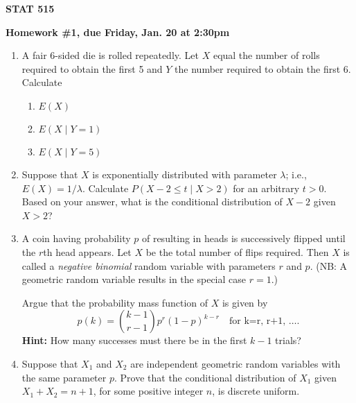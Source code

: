 \documentclass{article}
\begin{document}
\begin{center}
{\bf STAT 515}

{\bf Homework \#1, due Friday, Jan. 20 at 2:30pm}
\end{center}

\begin{enumerate}

  \item A fair 6-sided die is rolled repeatedly. Let $X$ equal the number of
  rolls required to obtain the first 5 and $Y$ the number required to obtain the
  first 6. Calculate

  \begin{enumerate}

  \item $E(X)$

  \item $E(X \mid Y=1)$

  \item $E(X \mid Y=5)$

  \end{enumerate}

  \item Suppose that $X$ is exponentially distributed with parameter $\lambda$;
  i.e., $E(X)=1/\lambda$. Calculate $P(X-2 \le t\mid X>2)$ for an arbitrary
  $t>0$. Based on your answer, what is the conditional distribution of $X-2$
  given $X>2$?

  \item A coin having probability $p$ of resulting in heads is successively
  flipped until the $r$th head appears. Let $X$ be the total number of flips
  required. Then $X$ is called a {\em negative binomial} random variable with
  parameters $r$ and $p$. (NB: A geometric random variable results in the
  special case $r=1$.)

  Argue that the probability mass function of $X$ is given by
  \[
  p(k) = {{k-1}\choose{r-1}} p^r(1-p)^{k-r} \quad\mbox{for k=r, r+1, \ldots}.
  \]
  {\bf Hint:}  How many successes must there be in the first $k-1$ trials?

  \item Suppose that $X_1$ and $X_2$ are independent geometric random variables
  with the same parameter $p$. Prove that the conditional distribution of $X_1$
  given $X_1+X_2=n+1$, for some positive integer $n$, is discrete uniform.


\end{enumerate}
\end{document}
